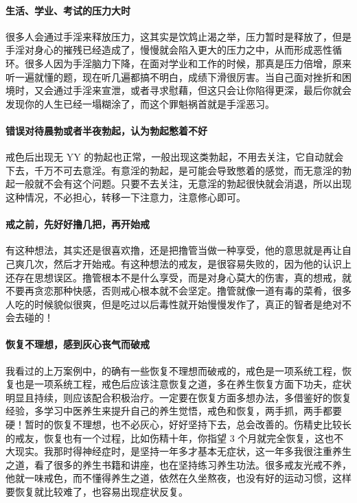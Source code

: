 \paragraph{生活、学业、考试的压力大时}

很多人会通过手淫来释放压力，这其实是饮鸩止渴之举，压力暂时是释放了，但是手淫对身心的摧残已经造成了，慢慢就会陷入更大的压力之中，从而形成恶性循环。很多人因为手淫脑力下降，在面对学业和工作的时候，那真是压力倍增，原来听一遍就懂的题，现在听几遍都搞不明白，成绩下滑很厉害。当自己面对挫折和困境时，又会通过手淫来宣泄，或者寻求慰藉，但这只会让你陷得更深，最后你就会发现你的人生已经一塌糊涂了，而这个罪魁祸首就是手淫恶习。

\paragraph{错误对待晨勃或者半夜勃起，认为勃起憋着不好}

戒色后出现无 YY 的勃起也正常，一般出现这类勃起，不用去关注，它自动就会下去，千万不可去意淫。有意淫的勃起，是可能会导致憋着的感觉，而无意淫的勃起一般就不会有这个问题。只要不去关注，无意淫的勃起很快就会消退，所以出现这种情况，不必担心，转移一下注意力，注意修心即可。

\paragraph{戒之前，先好好撸几把，再开始戒}

有这种想法，其实还是很喜欢撸，还是把撸管当做一种享受，他的意思就是再让自己爽几次，然后才开始戒。有这种想法的戒友，是很容易失败的，因为他的认识上还存在思想误区。撸管根本不是什么享受，而是对身心莫大的伤害，真的想戒，就不要再贪恋那种快感，否则戒心根本就不会坚定。撸管就像一道有毒的菜肴，很多人吃的时候貌似很爽，但是吃过以后毒性就开始慢慢发作了，真正的智者是绝对不会去碰的！

\paragraph{恢复不理想，感到灰心丧气而破戒}

我看过的上万案例中，的确有一些恢复不理想而破戒的，戒色是一项系统工程，恢复也是一项系统工程，戒色后应该注意恢复之道，多在养生恢复方面下功夫，症状明显且持续，则应该配合积极治疗。一定要在恢复方面多想办法，多借鉴好的恢复经验，多学习中医养生来提升自己的养生觉悟，戒色和恢复，两手抓，两手都要硬！暂时的恢复不理想，也不必灰心，好好坚持下去，总会改善的。伤精史比较长的戒友，恢复也有一个过程，比如伤精十年，你指望 3 个月就完全恢复，这也不大现实。我那时得神经症时，是坚持一年多才基本无症状，这一年多我很注重养生之道，看了很多的养生书籍和讲座，也在坚持练习养生功法。很多戒友光戒不养，他就一味戒色，而不懂得养生之道，依然在久坐熬夜，也没有好的运动习惯，这样要恢复就比较难了，也容易出现症状反复。

